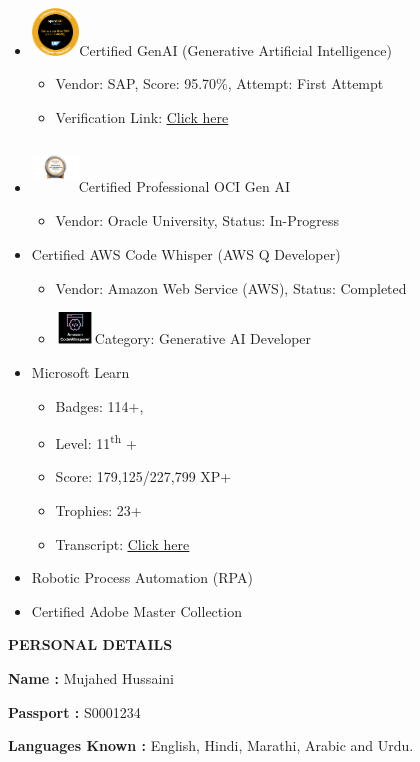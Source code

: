 \documentclass[a4paper]{article}
\begin{document}
\begin{itemize}
\item
  \includegraphics[width=0.49505in,height=0.49687in]{media/image23.png}Certified
  GenAI (Generative Artificial Intelligence)

  \begin{itemize}
  \item
    Vendor: SAP, Score: 95.70\%, Attempt: First Attempt
  \item
    Verification Link:
    \href{https://open.sap.com/verify/xogaz-dimeh-rybiv-foser-teted}{\ul{Click
    here}}
  \end{itemize}
\item
  \includegraphics[width=0.48889in,height=0.53542in]{media/image24.png}Certified
  Professional OCI Gen AI

  \begin{itemize}
  \item
    Vendor: Oracle University, Status: In-Progress
  \end{itemize}
\item
  Certified AWS Code Whisper (AWS Q Developer)

  \begin{itemize}
  \item
    Vendor: Amazon Web Service (AWS), Status: Completed
  \item
    \includegraphics[width=0.40829in,height=0.33497in]{media/image25.png}Category:
    Generative AI Developer
  \end{itemize}
\item
  Microsoft Learn

  \begin{itemize}
  \item
    Badges: 114+,
  \item
    Level: 11\textsuperscript{th} +
  \item
    Score: 179,125/227,799 XP+
  \item
    Trophies: 23+
  \item
    Transcript:
    \href{https://learn.microsoft.com/en-gb/users/mujahedh/transcript/d8k4jb84x69nm62}{\ul{Click
    here}}
  \end{itemize}
\item
  Robotic Process Automation (RPA)
\item
  Certified Adobe Master Collection
\end{itemize}

\textbf{PERSONAL DETAILS}

\textbf{Name :} Mujahed Hussaini

\textbf{Passport :} S0001234

\textbf{Languages Known :} English, Hindi, Marathi, Arabic and Urdu.
\end{document}
